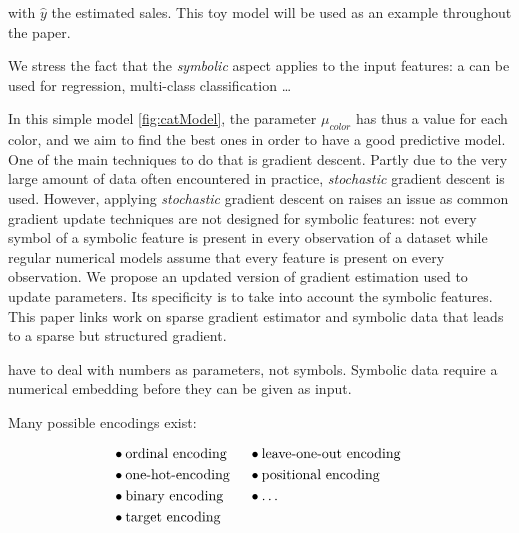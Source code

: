  with $\hat{y}$ the estimated sales. This toy model will be used as an example throughout the paper.

We stress the fact that the \textit{symbolic} aspect applies to the input features: a \catmod can be used for regression, multi-class classification \dots

In this simple model \ref{fig:catModel}, the parameter $\mu_{color}$ has thus a value for each color, and we aim to find the best ones in order to have a good predictive model. One of the main techniques to do that is gradient descent. Partly due to the very large amount of data often encountered in practice, \textit{stochastic} gradient descent is used. However, applying \textit{stochastic} gradient descent on \catmod raises an issue as common gradient update techniques are not designed for symbolic features: not every symbol of a symbolic feature is present in every observation of a dataset while regular numerical models assume that every feature is present on every observation. We propose an updated version of gradient estimation used to update parameters. Its specificity is to take into account the symbolic features. This paper links work on sparse gradient estimator and \ohe symbolic data that leads to a sparse but structured gradient.






\catmod have to deal with numbers as parameters, not symbols. Symbolic data require a numerical embedding before they can be given as input.




Many possible encodings exist:
\begin{fleqn}
\begin{align*}
    &\bullet \text{ordinal encoding} &&\bullet \text{leave-one-out encoding}\\
    &\bullet \text{\text{one-hot-encoding }}             &&\bullet \text{positional encoding} \quad \quad \\
    &\bullet \text{binary encoding}  &&\bullet \text{\dots}\\
    &\bullet \text{target encoding}  && \\
\end{align*}
\end{fleqn}



